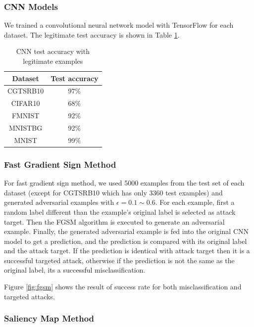 \documentclass{article}
\begin{document}
\subsubsection{CNN Models}

We trained a convolutional neural network model with TensorFlow\cite{tensorflow} for each dataset.
The legitimate test accuracy is shown in Table \ref{tab:cnnaccuracy}.

\begin{table}
\centering
\begin{tabular}{cc}
    \toprule
    Dataset & Test accuracy \\
    \midrule
    CGTSRB10 & 97\% \\
    CIFAR10 & 68\%  \\
    FMNIST & 92\% \\
    MNISTBG & 92\% \\
    MNIST & 99\% \\
    \bottomrule
\end{tabular}
\caption{\label{tab:cnnaccuracy} CNN test accuracy with legitimate examples}
\end{table}


\subsubsection{Fast Gradient Sign Method}

For fast gradient sign method, we used 5000 examples from the test set of each dataset (except for CGTSRB10 which has only 3360 test examples)
and generated adversarial examples with \(\epsilon=0.1 \sim 0.6\).
For each example, first a random label different than the example's original label is selected as attack target.
Then the FGSM algorithm is executed to generate an adversarial example.
Finally, the generated adversarial example is fed into the original CNN model to get a prediction,
and the prediction is compared with its original label and the attack target.
If the prediction is identical with attack target then it is a successful targeted attack,
otherwise if the prediction is not the same as the original label, its a successful misclassification.

Figure \ref{fig:fgsm} shows the result of success rate for both misclassification and targeted attacks.

\subsubsection{Saliency Map Method}
\end{document}
